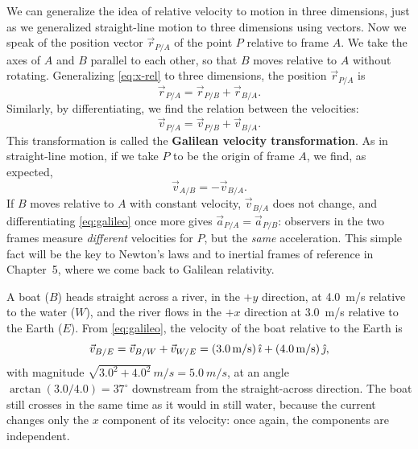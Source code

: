 \documentclass[11pt,a4paper]{article}
\begin{document}
We can generalize the idea of relative velocity to motion in three dimensions, just as we
generalized straight-line motion to three dimensions using vectors. Now we speak of the position
vector $\vec{r}_{P/A}$ of the point $P$ relative to frame $A$. We take the axes of $A$ and $B$
parallel to each other, so that $B$ moves relative to $A$ without rotating. Generalizing
\eqref{eq:x-rel} to three dimensions, the position $\vec{r}_{P/A}$ is
\begin{equation}\label{eq:r-rel}
  \vec{r}_{P/A} = \vec{r}_{P/B} + \vec{r}_{B/A} .
\end{equation}
Similarly, by differentiating, we find the relation between the velocities:
\begin{equation}\label{eq:galileo}
  \vec{v}_{P/A} = \vec{v}_{P/B} + \vec{v}_{B/A} .
\end{equation}
This transformation is called the \textbf{Galilean velocity transformation}. As in straight-line
motion, if we take $P$ to be the origin of frame $A$, we find, as expected,
\begin{equation}\label{eq:v-AB3}
  \vec{v}_{A/B} = -\vec{v}_{B/A} .
\end{equation}
If $B$ moves relative to $A$ with constant velocity, $\vec{v}_{B/A}$ does not change, and
differentiating \eqref{eq:galileo} once more gives $\vec{a}_{P/A} = \vec{a}_{P/B}$: observers in
the two frames measure \emph{different} velocities for $P$, but the \emph{same} acceleration. This
simple fact will be the key to Newton's laws and to inertial frames of reference in Chapter~5,
where we come back to Galilean relativity.

\begin{example}
A boat ($B$) heads straight across a river, in the $+y$ direction, at \qty{4.0}{m/s} relative to the
water ($W$), and the river flows in the $+x$ direction at \qty{3.0}{m/s} relative to the Earth
($E$). From \eqref{eq:galileo}, the velocity of the boat relative to the Earth is
\[
  \vec{v}_{B/E} = \vec{v}_{B/W} + \vec{v}_{W/E} = (\qty{3.0}{m/s})\,\hat{\imath} + (\qty{4.0}{m/s})\,\hat{\jmath} ,
\]
with magnitude $\sqrt{3.0^2 + 4.0^2}\,\unit{m/s} = \qty{5.0}{m/s}$, at an angle
$\arctan(3.0/4.0) = 37^\circ$ downstream from the straight-across direction. The boat still crosses
in the same time as it would in still water, because the current changes only the $x$ component of
its velocity: once again, the components are independent.
\end{example}

\end{document}
